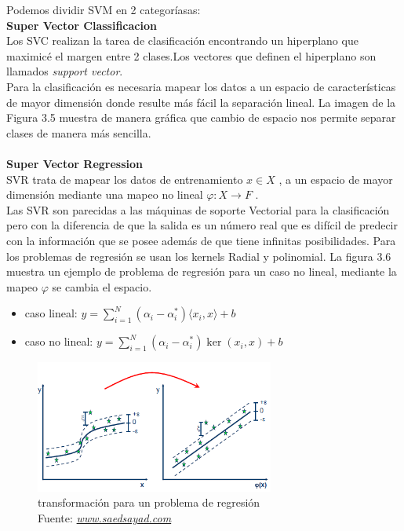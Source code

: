 Podemos dividir SVM en 2 categoríasas:\\
\textbf{Super Vector Classificacion}\\
Los SVC realizan la tarea de clasificación encontrando un hiperplano que maximicé el margen entre 2 clases.Los vectores que definen el hiperplano son llamados \textit{support vector}.\\ Para la clasificación es necesaria mapear los datos a un espacio de características de mayor dimensión donde resulte más fácil la separación lineal.  La imagen de la Figura 3.5 muestra de manera gráfica que cambio de espacio nos permite separar clases de manera más sencilla.\\ \\
\textbf{Super Vector Regression}\\
SVR trata de mapear los datos de entrenamiento $x \in X$ , a un espacio de mayor dimensión mediante una mapeo no lineal $ \varphi : X \to F$ .\\
Las SVR son parecidas a las máquinas de soporte Vectorial para la clasificación pero con la diferencia de que la salida es un número real que es difícil de predecir con la información que se posee además de que tiene infinitas posibilidades. Para los problemas de regresión se usan los kernels Radial y polinomial. La figura 3.6 muestra un ejemplo de problema de regresión para un caso no lineal, mediante la mapeo $ \varphi $ se cambia el espacio.

\begin{itemize}
	\item caso lineal:     $y=\sum_{i=1}^{N}(\alpha_{i}  -\alpha_{i}^*)\langle x_{i},x\rangle +b$
	\item caso no lineal:  $ y=\sum_{i=1}^{N}(\alpha_{i}  -\alpha_{i}^*)\ker(x_{i},x) +b$
\end{itemize}

\begin{figure}[H]
	\centering
	\includegraphics[width=0.7\textwidth]{Figures/SVR.png}
	\caption{transformación para un problema de regresión \\ Fuente:  \href{http://www.saedsayad.com/support_vector_machine_reg.htm}{\textit{www.saedsayad.com}}}
	\label{transformacion}
\end{figure} 

